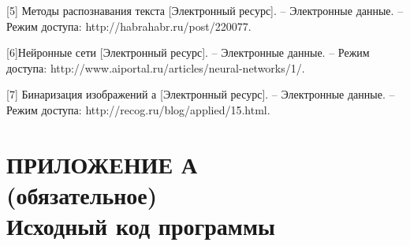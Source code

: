 \documentclass[14pt,a4paper]{extreport}
\begin{document}
\hspace{4ex}[5] Методы распознавания текста [Электронный ресурс]. – Электронные данные. – Режим доступа: http://habrahabr.ru/post/220077.\

\hspace{4ex}[6]Нейронные сети [Электронный ресурс]. – Электронные данные. – Режим доступа: http://www.aiportal.ru/articles/neural-networks/1/.\

\hspace{4ex}[7] Бинаризация изображений а [Электронный ресурс]. – Электронные данные. – Режим доступа: http://recog.ru/blog/applied/15.html.\






	
	\newpage
	\section*{\center\normalsize ПРИЛОЖЕНИЕ А\\(обязательное)\\Исходный код программы \endcenter}
	
\end{document}
